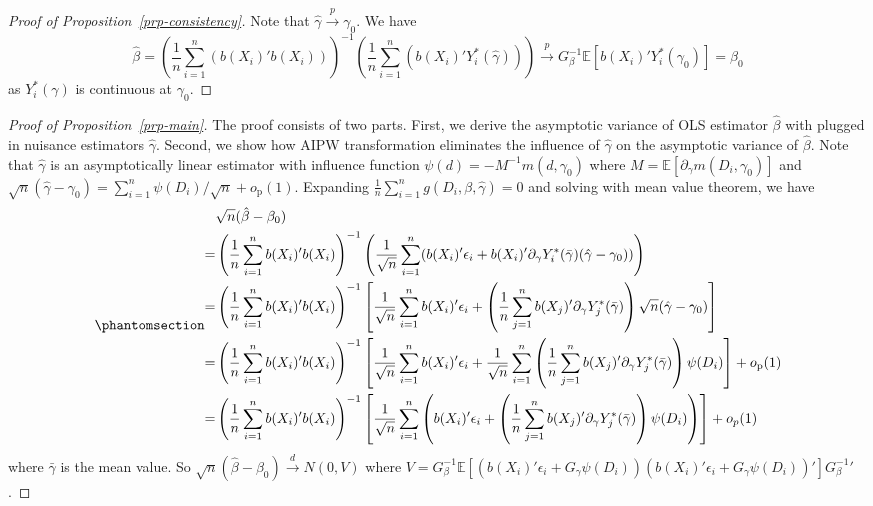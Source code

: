 \documentclass[
  12pt,
  12pt]{article}
\numberwithin{equation}{section}
\theoremstyle{definition}
\theoremstyle{plain}
\theoremstyle{plain}
\theoremstyle{remark}
\begin{document}
\begin{proof}[Proof of Proposition~\ref{prp-consistency}]
Note that \(\hat\gamma \xrightarrow{p} \gamma_0\). We have \[
\hat\beta = (\frac1n\sum_{i = 1}^{n}(b(X_i)'b(X_i)))^{-1}(\frac1n\sum_{i = 1}^{n}(b(X_i)'Y^*_i(\hat\gamma))) \xrightarrow{p} G_\beta^{-1}\mathbb{E}[b(X_i)'Y^*_i(\gamma_0)] = \beta_0
\] as \(Y_i^*(\gamma)\) is continuous at \(\gamma_0\).
\end{proof}

\begin{proof}[Proof of Proposition~\ref{prp-main}]
The proof consists of two parts. First, we derive the asymptotic
variance of OLS estimator \(\hat\beta\) with plugged in nuisance
estimators \(\hat\gamma\). Second, we show how AIPW transformation
eliminates the influence of \(\hat\gamma\) on the asymptotic variance of
\(\hat\beta\). Note that \(\hat\gamma\) is an asymptotically linear
estimator with influence function \(\psi(d) = -M^{-1}m(d, \gamma_0)\)
where \(M = \mathbb{E}[\partial_\gamma m(D_i, \gamma_0)]\) and
\(\sqrt{n}(\hat\gamma - \gamma_0) = \sum_{i = 1}^{n}\psi(D_i)/\sqrt{n} + o_\text{p}(1)\).
Expanding \(\frac1n\sum_{i = 1}^{n}g(D_i, \beta, \hat\gamma) = 0\) and
solving with mean value theorem, we have
\begin{equation}\phantomsection\label{eq-pluginvar}{
\begin{aligned}
& \sqrt{n}(\hat\beta - \beta_0) \\
= & \left( \frac1n\sum_{i = 1}^{n} b(X_i)'b(X_i) \right)^{-1}\left(\frac{1}{\sqrt{n}}\sum_{i = 1}^{n} (b(X_i)'\epsilon_i + b(X_i)'\partial_\gamma Y_i^*(\bar\gamma)(\hat\gamma - \gamma_0)) \right) \\
= & \left( \frac1n\sum_{i = 1}^{n} b(X_i)'b(X_i) \right)^{-1}\left[ \frac{1}{\sqrt{n}}\sum_{i = 1}^{n}b(X_i)'\epsilon_i + \left( \frac1n\sum_{j = 1}^{n}b(X_j)'\partial_\gamma Y_j^*(\bar\gamma) \right) \sqrt{n}(\hat\gamma - \gamma_0) \right] \\
= & \left( \frac1n\sum_{i = 1}^{n} b(X_i)'b(X_i) \right)^{-1}\left[ \frac{1}{\sqrt{n}}\sum_{i = 1}^{n}b(X_i)'\epsilon_i + \frac{1}{\sqrt{n}} \sum_{i = 1}^{n} \left( \frac1n\sum_{j = 1}^{n} b(X_j)' \partial_\gamma Y_j^*(\bar\gamma)  \right) \psi(D_i) \right] + o_\text{p}(1) \\
= & \left( \frac1n\sum_{i = 1}^{n} b(X_i)'b(X_i) \right)^{-1}\left[ \frac{1}{\sqrt{n}} \sum_{i = 1}^{n} \left(b(X_i)'\epsilon_i +\left( \frac1n\sum_{j = 1}^{n} b(X_j)' \partial_\gamma Y_j^*(\bar\gamma) \right) \psi(D_i)\right)\right] + o_p(1)
\end{aligned}
}\end{equation} where \(\bar\gamma\) is the mean value. So
\(\sqrt{n}(\hat\beta - \beta_0) \xrightarrow{d} N(0, V)\) where
\(V = G_\beta^{-1}\mathbb{E}[(b(X_i)'\epsilon_i + G_\gamma \psi(D_i))(b(X_i)'\epsilon_i + G_\gamma\psi(D_i))']G_\beta^{-1}{'}\).


\end{proof}
\end{document}

